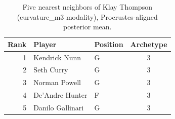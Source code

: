 \begin{table}[htbp]
  \centering\small
  \begin{tabular}{rllc}
    \toprule
    Rank & Player & Position & Archetype \\
    \midrule
    1 & Kendrick Nunn & G & 3 \\
    2 & Seth Curry & G & 3 \\
    3 & Norman Powell & G & 3 \\
    4 & De'Andre Hunter & F & 3 \\
    5 & Danilo Gallinari & G & 3 \\
    \bottomrule
  \end{tabular}
  \caption{Five nearest neighbors of Klay Thompson (curvature_m3 modality), Procrustes-aligned posterior mean.}
  \label{tab:Klay_Thompson_neighbors_curvature_m3}
\end{table}

